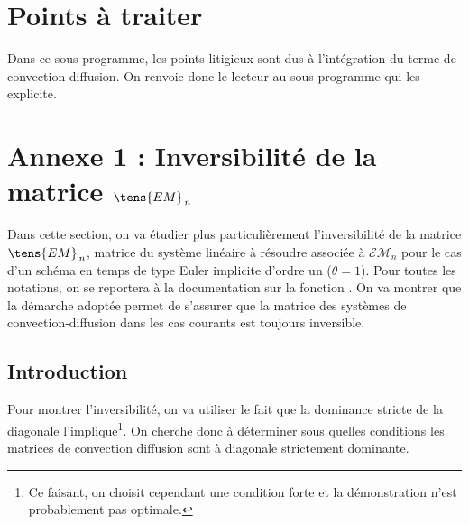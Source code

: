 \section*{Points \`{a} traiter}\label{Base_Covofi_section4}
Dans ce sous-programme, les points litigieux sont dus \`{a} l'int\'{e}gration du
terme de convection-diffusion. On renvoie donc le lecteur au sous-programme
 qui les explicite.
\clearpage
\section*{Annexe 1 : Inversibilit\'e de la matrice $\tens{EM}_{\,n}$ }
Dans cette section, on va \'etudier plus particuli\`{e}rement l'inversibilit\'e de
la matrice $\tens{EM}_{\,n}$, matrice du syst\`eme lin\'eaire
\`a r\'esoudre associ\'ee \`a $\mathcal{EM}_{n}$ pour le cas d'un sch\'{e}ma en temps
de type Euler implicite d'ordre un ($\theta=1$). Pour toutes les notations, on
se reportera \`{a} la documentation sur la fonction .
On va montrer que la d\'emarche adopt\'ee permet de
s'assurer que la matrice des syst\`emes de convection-diffusion dans les cas
courants est toujours inversible.

\subsection*{\bf Introduction }

Pour montrer l'inversibilit\'e, on va utiliser le fait que la dominance
stricte de la diagonale l'implique\footnote{Ce faisant, on choisit cependant une condition forte
et la d\'emonstration n'est probablement pas optimale.}. On cherche donc \`a
d\'eterminer sous quelles conditions les matrices de convection diffusion sont
\`a diagonale strictement dominante.

